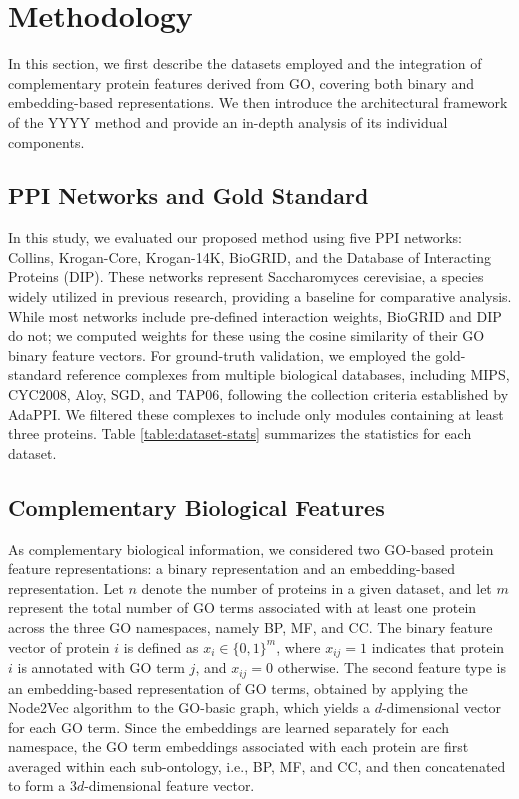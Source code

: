 \section{Methodology}
In this section, we first describe the datasets employed and the integration of complementary protein features derived from GO, covering both binary and embedding-based representations. We then introduce the architectural framework of the YYYY method and provide an in-depth analysis of its individual components.

\subsection{PPI Networks and Gold Standard}

In this study, we evaluated our proposed method using five PPI networks: Collins, Krogan-Core, Krogan-14K, BioGRID, and the Database of Interacting Proteins (DIP). These networks represent Saccharomyces cerevisiae, a species widely utilized in previous research, providing a baseline for comparative analysis. While most networks include pre-defined interaction weights, BioGRID and DIP do not; we computed weights for these using the cosine similarity of their GO binary feature vectors. For ground-truth validation, we employed the gold-standard reference complexes from multiple biological databases, including MIPS, CYC2008, Aloy, SGD, and TAP06, following the collection criteria established by AdaPPI. We filtered these complexes to include only modules containing at least three proteins. Table \ref{table:dataset-stats} summarizes the statistics for each dataset.

\subsection{Complementary Biological Features}
As complementary biological information, we considered two GO-based protein feature representations: a binary representation and an embedding-based representation. Let \(n\) denote the number of proteins in a given dataset, and let \(m\) represent the total number of GO terms associated with at least one protein across the three GO namespaces, namely BP, MF, and CC. The binary feature vector of protein \(i\) is defined as \(x_i \in \{0,1\}^m\), where \(x_{ij} = 1\) indicates that protein \(i\) is annotated with GO term \(j\), and \(x_{ij} = 0\) otherwise.
The second feature type is an embedding-based representation of GO terms, obtained by applying the Node2Vec algorithm to the GO-basic graph, which yields a \(d\)-dimensional vector for each GO term. Since the embeddings are learned separately for each namespace, the GO term embeddings associated with each protein are first averaged within each sub-ontology, i.e., BP, MF, and CC, and then concatenated to form a \(3d\)-dimensional feature vector.

